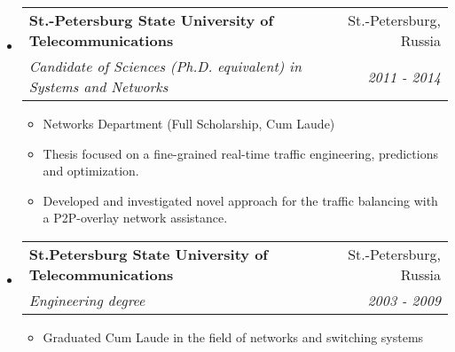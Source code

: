 \documentclass[letterpaper,11pt]{article}
\makeatletter
\newcommand{\resitem}[1]{\item #1 \vspace{-2pt}}
\newcommand{\ressubheading}[4]{
\begin{tabular*}{6.5in}{l@{\cftdotfill{\cftsecdotsep}\extracolsep{\fill}}r}
		\textbf{#1} & #2 \\
		\textit{#3} & \textit{#4} \\
\end{tabular*}\vspace{-6pt}}
\makeatother
\begin{document}
\begin{itemize}

	\item
	\ressubheading{St.-Petersburg State University of Telecommunications}{St.-Petersburg, Russia}{Candidate of Sciences (Ph.D. equivalent) in Systems and Networks}{2011 - 2014}
	\begin{itemize}
		\resitem{Networks Department (Full Scholarship, Cum Laude)}
		\resitem{Thesis focused on a fine-grained real-time traffic engineering, predictions and optimization.}
		\resitem{Developed and investigated novel approach for the traffic balancing with a P2P-overlay network assistance.}
	\end{itemize}

	\item
	\ressubheading{St.Petersburg State University of Telecommunications}{St.-Petersburg, Russia}{Engineering degree}{2003 - 2009}
	\begin{itemize}
		\resitem{Graduated Cum Laude in the field of networks and switching systems}
	\end{itemize}

\end{itemize}
\end{document}
